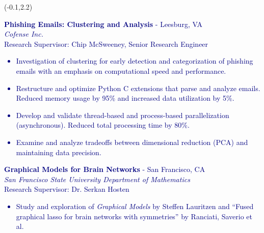 \documentclass[hidelinks, 10pt]{article}
\newcommand{\bodyspacing}{1mm}
\begin{document}
\begin{textblock}{9}(-0.1,2.2)
\setlength{\parindent}{0cm}
\small
\vspace{5mm}

\textcolor{navy}{\textbf{Phishing Emails: Clustering and Analysis} - Leesburg, VA\\
\emph{Cofense Inc.}\\
Research Supervisor: Chip McSweeney, Senior Research Engineer
	\makeatletter
	\def\@listi{\orig@listi\topsep=0.3\baselineskip}
	\makeatother
    \begin{itemize}[leftmargin=5mm]
    	\setlength\itemsep{-0.25em}
    	\item Investigation of clustering for early detection and
    	categorization of phishing emails with an emphasis on computational speed and
    	performance.
		\item Restructure and optimize Python C extensions that parse and
		analyze emails.  Reduced memory usage by 95\% and increased data
		utilization by 5\%.
		\item Develop and validate thread-based and process-based
		parallelization (asynchronous).  Reduced total processing time by 80\%.
		\item Examine and analyze tradeoffs between dimensional reduction (PCA) and
		maintaining data precision.
    \end{itemize}}

\vspace{\bodyspacing}

\textcolor{navy}{{\textbf{Graphical Models for Brain Networks} - San Francisco, CA}\\
\emph{San Francisco State University Department of Mathematics}\\
Research Supervisor: Dr. Serkan Hosten
    \begin{itemize}[leftmargin=5mm]
    	\setlength\itemsep{-0.25em}
    	\item Study and exploration of \emph{Graphical Models} by Steffen
    	Lauritzen and ``Fused graphical lasso for brain networks with
    	symmetries'' by Ranciati, Saverio et al.
    \end{itemize}}

\vspace{4mm}



\end{textblock}
\end{document}
